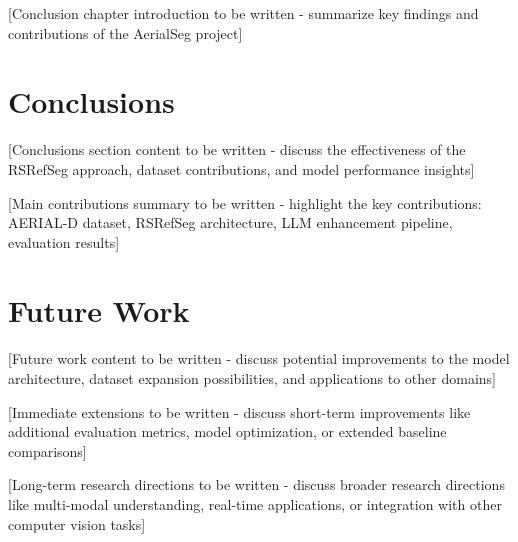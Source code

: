 \cleardoublepage
\label{chap:conclusion}

[Conclusion chapter introduction to be written - summarize key findings and contributions of the AerialSeg project]

\section{Conclusions}
[Conclusions section content to be written - discuss the effectiveness of the RSRefSeg approach, dataset contributions, and model performance insights]

[Main contributions summary to be written - highlight the key contributions: AERIAL-D dataset, RSRefSeg architecture, LLM enhancement pipeline, evaluation results]

\section{Future Work}
[Future work content to be written - discuss potential improvements to the model architecture, dataset expansion possibilities, and applications to other domains]

[Immediate extensions to be written - discuss short-term improvements like additional evaluation metrics, model optimization, or extended baseline comparisons]

[Long-term research directions to be written - discuss broader research directions like multi-modal understanding, real-time applications, or integration with other computer vision tasks]